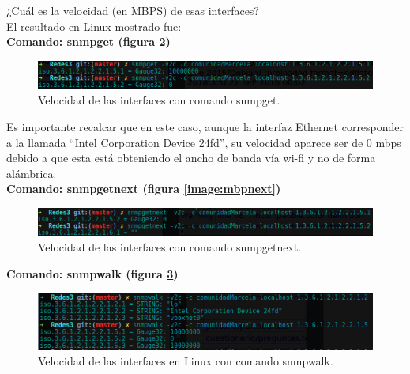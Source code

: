 \item ¿Cuál es la velocidad (en MBPS) de esas interfaces?
\\ El resultado en Linux mostrado fue:
\\
\textbf{Comando: snmpget (figura \ref{image:mbpget})}
\FloatBarrier
\begin{figure}[htbp!]
		\centering
	\includegraphics[width=.9 \textwidth]{images/mbpget}
		\caption{Velocidad de las interfaces con comando snmpget.}		\label{image:mbpget}
\end{figure}
\FloatBarrier

Es importante recalcar que en este caso, aunque la interfaz Ethernet corresponder a la llamada ``Intel Corporation Device 24fd'', su velocidad aparece ser de 0 mbps debido a que esta está obteniendo el ancho de banda vía wi-fi y no de forma alámbrica.
\\
\textbf{Comando: snmpgetnext (figura \ref{image:mbpnext})}
\FloatBarrier
\begin{figure}[htbp!]
		\centering
	\includegraphics[width=.9 \textwidth]{images/mbpnext}
		\caption{Velocidad de las interfaces con comando snmpgetnext.}		\label{image:mbpget}
\end{figure}
\FloatBarrier

\textbf{Comando: snmpwalk (figura \ref{image:velocidadInterfaces})}
\FloatBarrier
\begin{figure}[htbp!]
		\centering
			\includegraphics[width=.9 \textwidth]{images/Pregunta3L}
		\caption{Velocidad de las interfaces en Linux con comando snmpwalk.}
		\label{image:velocidadInterfaces}
\end{figure}
\FloatBarrier

